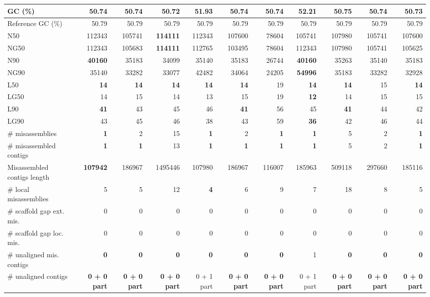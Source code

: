 \documentclass[12pt,a4paper]{article}
\begin{document}
\begin{table}[ht]
\begin{center}
\begin{tabular}{|l*{10}{|r}|}
GC (\%) & 50.74 & 50.74 & 50.72 & 51.93 & 50.74 & 50.74 & 52.21 & 50.75 & 50.74 & 50.73 \\ \hline
Reference GC (\%) & 50.79 & 50.79 & 50.79 & 50.79 & 50.79 & 50.79 & 50.79 & 50.79 & 50.79 & 50.79 \\ \hline
N50 & 112343 & 105741 & {\bf 114111} & 112343 & 107600 & 78604 & 105741 & 107980 & 105741 & 107600 \\ \hline
NG50 & 112343 & 105683 & {\bf 114111} & 112765 & 103495 & 78604 & 112343 & 107980 & 105741 & 105625 \\ \hline
N90 & {\bf 40160} & 35183 & 34099 & 35140 & 35183 & 26744 & {\bf 40160} & 35263 & 35140 & 35183 \\ \hline
NG90 & 35140 & 33282 & 33077 & 42482 & 34064 & 24205 & {\bf 54996} & 35183 & 33282 & 32928 \\ \hline
L50 & {\bf 14} & {\bf 14} & {\bf 14} & {\bf 14} & {\bf 14} & 19 & {\bf 14} & {\bf 14} & 15 & {\bf 14} \\ \hline
LG50 & 14 & 15 & 14 & 13 & 15 & 19 & {\bf 12} & 14 & 15 & 15 \\ \hline
L90 & {\bf 41} & 43 & 45 & 46 & {\bf 41} & 56 & 45 & {\bf 41} & 44 & 42 \\ \hline
LG90 & 43 & 45 & 46 & 38 & 43 & 59 & {\bf 36} & 42 & 46 & 44 \\ \hline
\# misassemblies & {\bf 1} & 2 & 15 & {\bf 1} & 2 & {\bf 1} & {\bf 1} & 5 & 2 & {\bf 1} \\ \hline
\# misassembled contigs & {\bf 1} & {\bf 1} & 13 & {\bf 1} & {\bf 1} & {\bf 1} & {\bf 1} & 5 & 2 & {\bf 1} \\ \hline
Misassembled contigs length & {\bf 107942} & 186967 & 1495446 & 107980 & 186967 & 116007 & 185963 & 509118 & 297660 & 185116 \\ \hline
\# local misassemblies & 5 & 5 & 12 & {\bf 4} & 6 & 9 & 7 & 18 & 8 & 5 \\ \hline
\# scaffold gap ext. mis. & 0 & 0 & 0 & 0 & 0 & 0 & 0 & 0 & 0 & 0 \\ \hline
\# scaffold gap loc. mis. & 0 & 0 & 0 & 0 & 0 & 0 & 0 & 0 & 0 & 0 \\ \hline
\# unaligned mis. contigs & {\bf 0} & {\bf 0} & {\bf 0} & {\bf 0} & {\bf 0} & {\bf 0} & 1 & {\bf 0} & {\bf 0} & {\bf 0} \\ \hline
\# unaligned contigs & {\bf 0 + 0 part} & {\bf 0 + 0 part} & {\bf 0 + 0 part} & 0 + 1 part & {\bf 0 + 0 part} & {\bf 0 + 0 part} & 0 + 1 part & {\bf 0 + 0 part} & {\bf 0 + 0 part} & {\bf 0 + 0 part} \\ \hline

\end{tabular}
\end{center}
\end{table}
\end{document}
